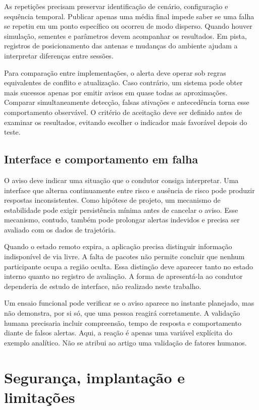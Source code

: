 \documentclass[conference,a4paper]{IEEEtran}
\begin{document}
As repetições precisam preservar identificação de cenário, configuração e sequência temporal. Publicar apenas uma média final impede saber se uma falha se repetiu em um ponto específico ou ocorreu de modo disperso. Quando houver simulação, sementes e parâmetros devem acompanhar os resultados. Em pista, registros de posicionamento das antenas e mudanças do ambiente ajudam a interpretar diferenças entre sessões.

Para comparação entre implementações, o alerta deve operar sob regras equivalentes de conflito e atualização. Caso contrário, um sistema pode obter mais sucessos apenas por emitir avisos em quase todas as aproximações. Comparar simultaneamente detecção, falsas ativações e antecedência torna esse comportamento observável. O critério de aceitação deve ser definido antes de examinar os resultados, evitando escolher o indicador mais favorável depois do teste.

\subsection{Interface e comportamento em falha}
O aviso deve indicar uma situação que o condutor consiga interpretar. Uma interface que alterna continuamente entre risco e ausência de risco pode produzir respostas inconsistentes. Como hipótese de projeto, um mecanismo de estabilidade pode exigir persistência mínima antes de cancelar o aviso. Esse mecanismo, contudo, também pode prolongar alertas indevidos e precisa ser avaliado com os dados de trajetória.

Quando o estado remoto expira, a aplicação precisa distinguir informação indisponível de via livre. A falta de pacotes não permite concluir que nenhum participante ocupa a região oculta. Essa distinção deve aparecer tanto no estado interno quanto no registro de avaliação. A forma de apresentá-la ao condutor dependeria de estudo de interface, não realizado neste trabalho.

Um ensaio funcional pode verificar se o aviso aparece no instante planejado, mas não demonstra, por si só, que uma pessoa reagirá corretamente. A validação humana precisaria incluir compreensão, tempo de resposta e comportamento diante de falsos alertas. Aqui, a reação é apenas uma variável explícita do exemplo analítico. Não se atribui ao artigo uma validação de fatores humanos.

\section{Segurança, implantação e limitações}
\end{document}

